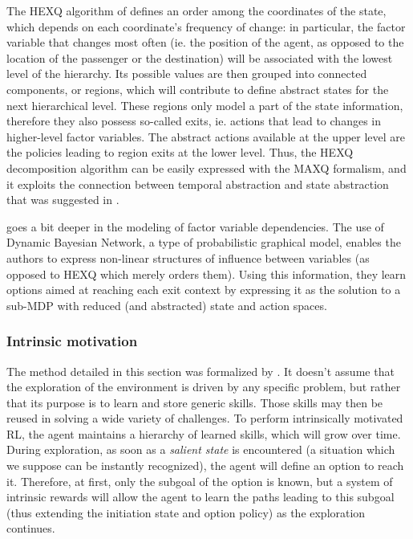 \documentclass{article}
\begin{document}
The HEXQ algorithm of \cite{hengst_discovering_2002} defines an order among the coordinates of the state, which depends on each coordinate's frequency of change: in particular, the factor variable that changes most often (ie. the position of the agent, as opposed to the location of the passenger or the destination) will be associated with the lowest level of the hierarchy. Its possible values are then grouped into connected components, or regions, which will contribute to define abstract states for the next hierarchical level. These regions only model a part of the state information, therefore they also possess so-called exits, ie. actions that lead to changes in higher-level factor variables. The abstract actions available at the upper level are the policies leading to region exits at the lower level. Thus, the HEXQ decomposition algorithm can be easily expressed with the MAXQ formalism, and it exploits the connection between temporal abstraction and state abstraction that was suggested in \cite{dietterich_hierarchical_2000}.

\cite{jonsson_causal_2006} goes a bit deeper in the modeling of factor variable dependencies. The use of Dynamic Bayesian Network, a type of probabilistic graphical model, enables the authors to express non-linear structures of influence between variables (as opposed to HEXQ which merely orders them). Using this information, they learn options aimed at reaching each exit context by expressing it as the solution to a sub-MDP with reduced (and abstracted) state and action spaces.

\subsubsection{Intrinsic motivation}

The method detailed in this section was formalized by \cite{chentanez_intrinsically_2005}. It doesn't assume that the exploration of the environment is driven by any specific problem, but rather that its purpose is to learn and store generic skills. Those skills may then be reused in solving a wide variety of challenges.
To perform intrinsically motivated RL, the agent maintains a hierarchy of learned skills, which will grow over time. During exploration, as soon as a \textit{salient state} is encountered (a situation which we suppose can be instantly recognized), the agent will define an option to reach it. Therefore, at first, only the subgoal of the option is known, but a system of intrinsic rewards will allow the agent to learn the paths leading to this subgoal (thus extending the initiation state and option policy) as the exploration continues.
\end{document}
